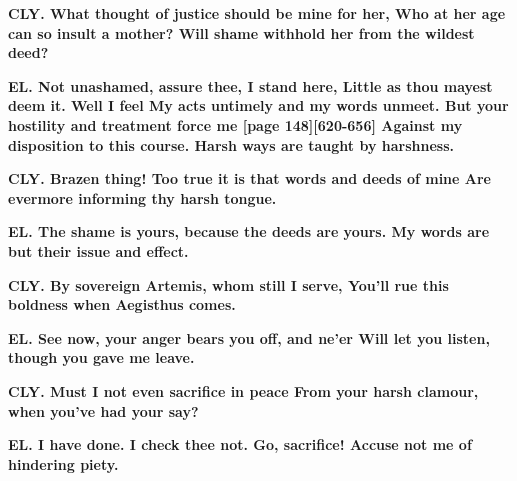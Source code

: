 \documentclass[11pt,letter]{book}
\begin{document}
\par \textbf{CLY. What thought of justice should be mine for her, Who at her age can so insult a mother? Will shame withhold her from the wildest deed?}
\par 

\par \textbf{EL. Not unashamed, assure thee, I stand here, Little as thou mayest deem it. Well I feel My acts untimely and my words unmeet. But your hostility and treatment force me [page 148][620-656] Against my disposition to this course. Harsh ways are taught by harshness.}
\par 

\par \textbf{CLY. Brazen thing! Too true it is that words and deeds of mine Are evermore informing thy harsh tongue.}
\par 

\par \textbf{EL. The shame is yours, because the deeds are yours. My words are but their issue and effect.}
\par 

\par \textbf{CLY. By sovereign Artemis, whom still I serve, You’ll rue this boldness when Aegisthus comes.}
\par 

\par \textbf{EL. See now, your anger bears you off, and ne’er Will let you listen, though you gave me leave.}
\par 

\par \textbf{CLY. Must I not even sacrifice in peace From your harsh clamour, when you’ve had your say?}
\par 

\par \textbf{EL. I have done. I check thee not. Go, sacrifice! Accuse not me of hindering piety.}
\par 
\end{document}
